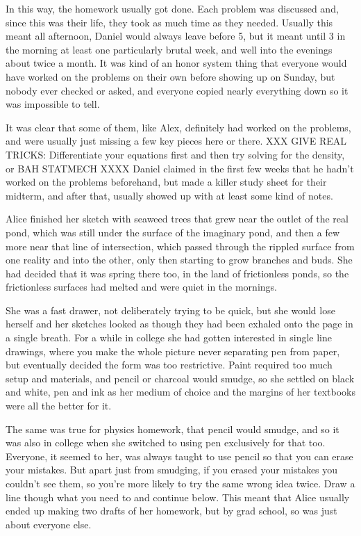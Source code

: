 In this way, the homework usually got done. Each problem was discussed and, since this was their life, they took as much time as they needed. Usually this meant all afternoon, Daniel would always leave before 5, but it meant until 3 in the morning at least one particularly brutal week, and well into the evenings about twice a month. It was kind of an honor system thing that everyone would have worked on the problems on their own before showing up on Sunday, but nobody ever checked or asked, and everyone copied nearly everything down so it was impossible to tell.

It was clear that some of them, like Alex, definitely had worked on the problems, and were usually just missing a few key pieces here or there. XXX GIVE REAL TRICKS: Differentiate your equations first and then try solving for the density, or BAH STATMECH XXXX Daniel claimed in the first few weeks that he hadn't worked on the problems beforehand, but made a killer study sheet for their midterm, and after that, usually showed up with at least some kind of notes. 

\mypause

Alice finished her sketch with seaweed trees that grew near the outlet of the real pond, which was still under the surface of the imaginary pond, and then a few more near that line of intersection, which passed through the rippled surface from one reality and into the other, only then starting to grow branches and buds. She had decided that it was spring there too, in the land of frictionless ponds, so the frictionless surfaces had melted and were quiet in the mornings.

She was a fast drawer, not deliberately trying to be quick, but she would lose herself and her sketches looked as though they had been exhaled onto the page in a single breath. For a while in college she had gotten interested in single line drawings, where you make the whole picture never separating pen from paper, but eventually decided the form was too restrictive. Paint required too much setup and materials, and pencil or charcoal would smudge, so she settled on black and white, pen and ink as her medium of choice and the margins of her textbooks were all the better for it. 

The same was true for physics homework, that pencil would smudge, and so it was also in college when she switched to using pen exclusively for that too. Everyone, it seemed to her, was always taught to use pencil so that you can erase your mistakes. But apart just from smudging, if you erased your mistakes you couldn't see them, so you're more likely to try the same wrong idea twice. Draw a line though what you need to and continue below. This meant that Alice usually ended up making two drafts of her homework, but by grad school, so was just about everyone else. 


